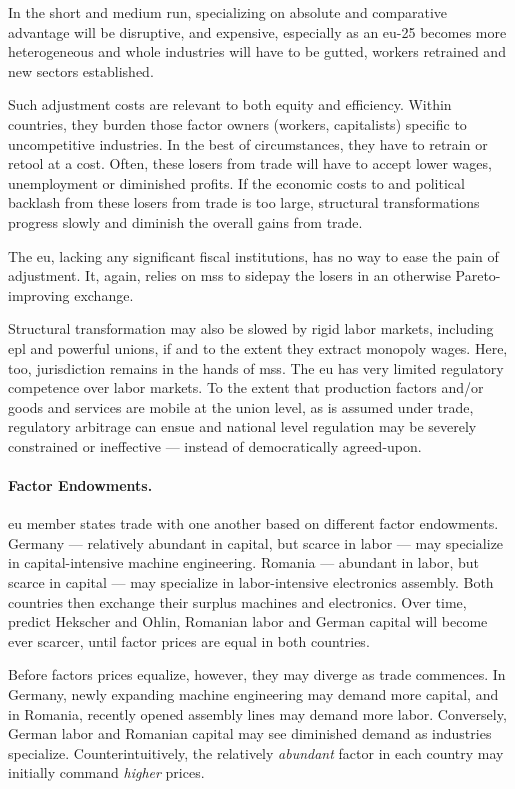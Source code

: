 In the short and medium run, specializing on absolute and comparative advantage will be disruptive, and expensive, especially as an \gls{eu}-25 becomes more heterogeneous and whole industries will have to be gutted, workers retrained and new sectors established.

Such adjustment costs are relevant to both equity and efficiency.
Within countries, they burden those factor owners (workers, capitalists) specific to uncompetitive industries.
In the best of circumstances, they have to retrain or retool at a cost.
Often, these losers from trade will have to accept lower wages, unemployment or diminished profits.
If the economic costs to and political backlash from these losers from trade is too large, structural transformations progress slowly and diminish the overall gains from trade.

The \gls{eu}, lacking any significant fiscal institutions, has no way to ease the pain of adjustment.
It, again, relies on \glspl{ms} to sidepay the losers in an otherwise Pareto-improving exchange.

Structural transformation may also be slowed by rigid labor markets, including \gls{epl} and powerful unions, if and to the extent they extract monopoly wages.
Here, too, jurisdiction remains in the hands of \glspl{ms}.
The \gls{eu} has very limited regulatory competence over labor markets.
To the extent that production factors and/or goods and services are mobile at the union level, as is assumed under trade, regulatory arbitrage can ensue and national level regulation may be severely constrained or ineffective --- instead of democratically agreed-upon.

\paragraph{Factor Endowments.}
\gls{eu} member states trade with one another based on different factor endowments.
Germany --- relatively abundant in capital, but scarce in labor --- may specialize in capital-intensive machine engineering.
Romania --- abundant in labor, but scarce in capital --- may specialize in labor-intensive electronics assembly.
Both countries then exchange their surplus machines and electronics.
Over time, predict Hekscher and Ohlin, Romanian labor and German capital will become ever scarcer, until factor prices are equal in both countries.

Before factors prices equalize, however, they may diverge as trade commences.
In Germany, newly expanding machine engineering may demand more capital, and in Romania, recently opened assembly lines may demand more labor.
Conversely, German labor and Romanian capital may see diminished demand as industries specialize.
Counterintuitively, the relatively \emph{abundant} factor in each country may initially command \emph{higher} prices.

